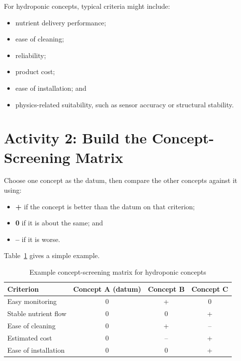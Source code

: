 For hydroponic concepts, typical criteria might include:
\begin{itemize}
    \item nutrient delivery performance;
    \item ease of cleaning;
    \item reliability;
    \item product cost;
    \item ease of installation; and
    \item physics-related suitability, such as sensor accuracy or structural stability.
\end{itemize}

\section{Activity 2: Build the Concept-Screening Matrix}

Choose one concept as the datum, then compare the other concepts against it using:
\begin{itemize}
    \item \textbf{+} if the concept is better than the datum on that criterion;
    \item \textbf{0} if it is about the same; and
    \item \textbf{--} if it is worse.
\end{itemize}

Table~\ref{tab:session11-screening-matrix} gives a simple example.

\begin{table}[htbp]
\centering
\caption{Example concept-screening matrix for hydroponic concepts}
\label{tab:session11-screening-matrix}
\renewcommand{\arraystretch}{1.2}
\begin{tabularx}{\textwidth}{|>{\raggedright\arraybackslash}p{}|c|c|c|}
\hline
\textbf{Criterion} & \textbf{Concept A (datum)} & \textbf{Concept B} & \textbf{Concept C} \\
\hline
Easy monitoring & 0 & + & 0 \\
\hline
Stable nutrient flow & 0 & 0 & + \\
\hline
Ease of cleaning & 0 & + & -- \\
\hline
Estimated cost & 0 & -- & + \\
\hline
Ease of installation & 0 & 0 & + \\
\hline
\end{tabularx}
\end{table}

